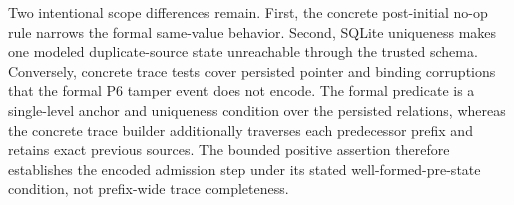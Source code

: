 Two intentional scope differences remain. First, the concrete post-initial no-op rule narrows the formal same-value behavior. Second, SQLite uniqueness makes one modeled duplicate-source state unreachable through the trusted schema. Conversely, concrete trace tests cover persisted pointer and binding corruptions that the formal P6 tamper event does not encode. The formal  predicate is a single-level anchor and uniqueness condition over the persisted relations, whereas the concrete trace builder additionally traverses each predecessor prefix and retains exact previous sources. The bounded positive assertion therefore establishes the encoded admission step under its stated well-formed-pre-state condition, not prefix-wide trace completeness.
